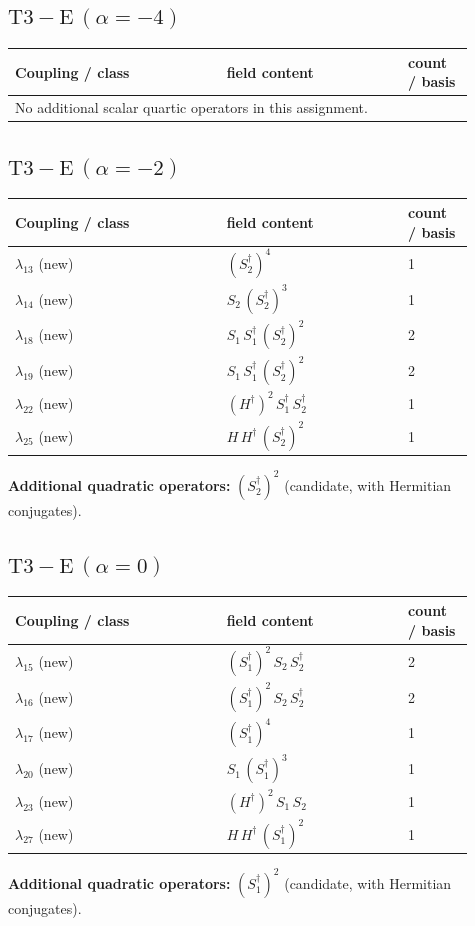 \documentclass[9pt,a4paper]{article}
\begin{document}
\subsection*{$ \mathrm{T3-E}\,(\alpha=-4) $}
\begin{longtable}{@{}p{0.42\linewidth}p{0.36\linewidth}p{0.13\linewidth}@{}}
\toprule
Coupling / class & field content & count / basis\\
\midrule
\endhead
\multicolumn{3}{l}{No additional scalar quartic operators in this assignment.}\\
\bottomrule
\end{longtable}
\subsection*{$ \mathrm{T3-E}\,(\alpha=-2) $}
\begin{longtable}{@{}p{0.42\linewidth}p{0.36\linewidth}p{0.13\linewidth}@{}}
\toprule
Coupling / class & field content & count / basis\\
\midrule
\endhead
$\lambda_{13}$ (new) & $\left(S_2^\dagger\right)^{4}$ & 1 \\
$\lambda_{14}$ (new) & $S_2\, \left(S_2^\dagger\right)^{3}$ & 1 \\
$\lambda_{18}$ (new) & $S_1\, S_1^\dagger\, \left(S_2^\dagger\right)^{2}$ & 2 \\
$\lambda_{19}$ (new) & $S_1\, S_1^\dagger\, \left(S_2^\dagger\right)^{2}$ & 2 \\
$\lambda_{22}$ (new) & $\left(H^\dagger\right)^{2}\, S_1^\dagger\, S_2^\dagger$ & 1 \\
$\lambda_{25}$ (new) & $H\, H^\dagger\, \left(S_2^\dagger\right)^{2}$ & 1 \\
\bottomrule
\end{longtable}
\textbf{Additional quadratic operators:}
$\left(S_2^\dagger\right)^{2}$ (candidate, with Hermitian conjugates).
\subsection*{$ \mathrm{T3-E}\,(\alpha=0) $}
\begin{longtable}{@{}p{0.42\linewidth}p{0.36\linewidth}p{0.13\linewidth}@{}}
\toprule
Coupling / class & field content & count / basis\\
\midrule
\endhead
$\lambda_{15}$ (new) & $\left(S_1^\dagger\right)^{2}\, S_2\, S_2^\dagger$ & 2 \\
$\lambda_{16}$ (new) & $\left(S_1^\dagger\right)^{2}\, S_2\, S_2^\dagger$ & 2 \\
$\lambda_{17}$ (new) & $\left(S_1^\dagger\right)^{4}$ & 1 \\
$\lambda_{20}$ (new) & $S_1\, \left(S_1^\dagger\right)^{3}$ & 1 \\
$\lambda_{23}$ (new) & $\left(H^\dagger\right)^{2}\, S_1\, S_2$ & 1 \\
$\lambda_{27}$ (new) & $H\, H^\dagger\, \left(S_1^\dagger\right)^{2}$ & 1 \\
\bottomrule
\end{longtable}
\textbf{Additional quadratic operators:}
$\left(S_1^\dagger\right)^{2}$ (candidate, with Hermitian conjugates).
\end{document}
